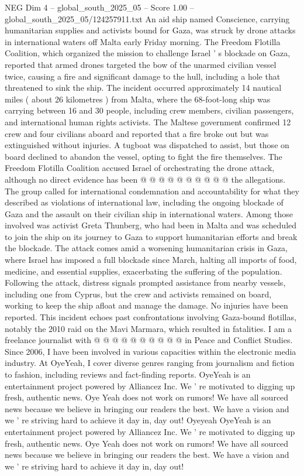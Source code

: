 \begin{textsample}{NEG Dim 4 – global\_south\_2025\_05 – Score 1.00 – global\_south\_2025\_05/124257911.txt}  \label{ex:f4_neg_363}
An aid ship named Conscience, carrying humanitarian supplies and activists bound for Gaza, was struck by drone attacks in international waters off Malta early Friday morning.
The Freedom Flotilla Coalition, which organized the mission to challenge Israel ' s blockade on Gaza, reported that armed drones targeted the bow of the unarmed civilian vessel twice, causing a fire and significant damage to the hull, including a hole that threatened to sink the ship.
The incident occurred approximately 14 nautical miles ( about 26 kilometres ) from Malta, where the 68-foot-long ship was carrying between 16 and 30 people, including crew members, civilian passengers, and international human rights activists.
The Maltese government confirmed 12 crew and four civilians aboard and reported that a fire broke out but was extinguished without injuries.
A tugboat was dispatched to assist, but those on board declined to abandon the vessel, opting to fight the fire themselves.
The Freedom Flotilla Coalition accused Israel of orchestrating the drone attack, although no direct evidence has been @ @ @ @ @ @ @ @ @ @ the allegations.
The group called for international condemnation and accountability for what they described as violations of international law, including the ongoing blockade of Gaza and the assault on their civilian ship in international waters.
Among those involved was activist Greta Thunberg, who had been in Malta and was scheduled to join the ship on its journey to Gaza to support humanitarian efforts and break the blockade.
The attack comes amid a worsening humanitarian crisis in Gaza, where Israel has imposed a full blockade since March, halting all imports of food, medicine, and essential supplies, exacerbating the suffering of the population.
Following the attack, distress signals prompted assistance from nearby vessels, including one from Cyprus, but the crew and activists remained on board, working to keep the ship afloat and manage the damage.
No injuries have been reported.
This incident echoes past confrontations involving Gaza-bound flotillas, notably the 2010 raid on the Mavi Marmara, which resulted in fatalities.
I am a freelance journalist with @ @ @ @ @ @ @ @ @ @ in Peace and Conflict Studies.
Since 2006, I have been involved in various capacities within the electronic media industry.
At OyeYeah, I cover diverse genres ranging from journalism and fiction to fashion, including reviews and fact-finding reports.
OyeYeah is an entertainment project powered by Alliancez Inc.
We ' re motivated to digging up fresh, authentic news.
Oye Yeah does not work on rumors!
We have all sourced news because we believe in bringing our readers the best.
We have a vision and we ' re striving hard to achieve it day in, day out!
Oyeyeah OyeYeah is an entertainment project powered by Alliancez Inc.
We ' re motivated to digging up fresh, authentic news.
Oye Yeah does not work on rumors!
We have all sourced news because we believe in bringing our readers the best.
We have a vision and we ' re striving hard to achieve it day in, day out!

\end{textsample}
